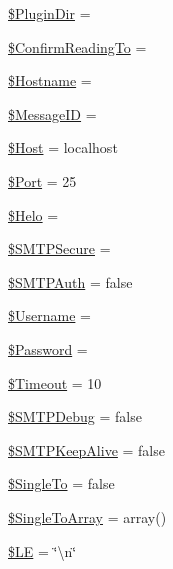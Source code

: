 \begin{DoxyCompactItemize}
\hyperlink{class_p_h_p_mailer_a80c30e6b011ed425f82610685c961df7}{\$\+Plugin\+Dir} = \textquotesingle{}\textquotesingle{}
\item 
\hyperlink{class_p_h_p_mailer_a7bd5233c41d3f1cd2b653433fa88b8ed}{\$\+Confirm\+Reading\+To} = \textquotesingle{}\textquotesingle{}
\item 
\hyperlink{class_p_h_p_mailer_a48a6eac112dcc8617b4001d985b656c8}{\$\+Hostname} = \textquotesingle{}\textquotesingle{}
\item 
\hyperlink{class_p_h_p_mailer_adf09200a8d2c3460c6b16a7ae554a69e}{\$\+Message\+I\+D} = \textquotesingle{}\textquotesingle{}
\item 
\hyperlink{class_p_h_p_mailer_ad019d6ecb4db4cd981fb7aeae7fbfc2c}{\$\+Host} = \textquotesingle{}localhost\textquotesingle{}
\item 
\hyperlink{class_p_h_p_mailer_a3e9844389378050f7a95b67b329edf90}{\$\+Port} = 25
\item 
\hyperlink{class_p_h_p_mailer_a361dc28dd21d5c555a1645bcdf8bab66}{\$\+Helo} = \textquotesingle{}\textquotesingle{}
\item 
\hyperlink{class_p_h_p_mailer_a70335250830975e0f1f77bb73b90ca54}{\$\+S\+M\+T\+P\+Secure} = \textquotesingle{}\textquotesingle{}
\item 
\hyperlink{class_p_h_p_mailer_aba02a4c8ff018b73b192831a761fe9ca}{\$\+S\+M\+T\+P\+Auth} = false
\item 
\hyperlink{class_p_h_p_mailer_a0e2ea0d42b9b800eb5bf8660587f5f7f}{\$\+Username} = \textquotesingle{}\textquotesingle{}
\item 
\hyperlink{class_p_h_p_mailer_ae3ac8512c0fd8924c7112671ead08cf7}{\$\+Password} = \textquotesingle{}\textquotesingle{}
\item 
\hyperlink{class_p_h_p_mailer_acaf3ec06f89f4024c5dbeb1a9ecf321c}{\$\+Timeout} = 10
\item 
\hyperlink{class_p_h_p_mailer_a5f952b7bed25b8423aec0a5b308d4bb1}{\$\+S\+M\+T\+P\+Debug} = false
\item 
\hyperlink{class_p_h_p_mailer_a7ff340050ca2061f7dc63b92e3f18586}{\$\+S\+M\+T\+P\+Keep\+Alive} = false
\item 
\hyperlink{class_p_h_p_mailer_a7c792e2e3e3cb98d869c9a68b73bc3a0}{\$\+Single\+To} = false
\item 
\hyperlink{class_p_h_p_mailer_a1a4e8b669019fd06e46df4ad0ef47ec4}{\$\+Single\+To\+Array} = array()
\item 
\hyperlink{class_p_h_p_mailer_a5ed269759d4ddf4fdf658930d93f69f7}{\$\+L\+E} = \char`\"{}\textbackslash{}n\char`\"{}

\end{DoxyCompactItemize}
